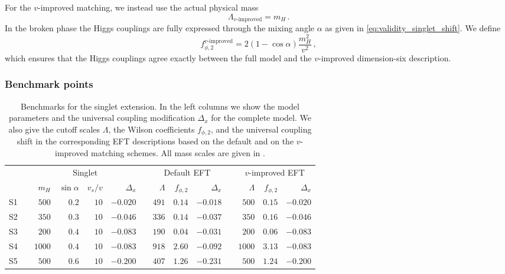 For the $v$-improved matching, we instead use the actual physical mass
%
\begin{equation}
    \Lambda_{\text{$v$-improved}} = m_H \,.
\end{equation}
%
In the broken phase the Higgs couplings are fully expressed through
the mixing angle $\alpha$ as given in
\autoref{eq:validity_singlet_shift}. We define
%
\begin{equation}
  f_{\phi,2}^{\text{$v$-improved}} = 2 ( 1 - \cos \alpha) \frac {m_H^2} {v^2} \,,
\end{equation} 
%
which ensures that the Higgs couplings agree exactly between the full
model and the $v$-improved dimension-six description.



\subsubsection{Benchmark points}

\begin{table}
  \begin{tabular}{c c rrrr c rrr c rrr}
    \toprule
    \multirow{2}{*}{} && \multicolumn{4}{c}{Singlet} &&
    \multicolumn{3}{c}{Default EFT} && \multicolumn{3}{c}{$v$-improved EFT} \\
    \cmidrule{3-6} \cmidrule{8-10} \cmidrule{12-14}
    && $m_H$ & $\sin\alpha$ & $v_s/v$ & $\Delta_x$ &&
    $\Lambda$ & ${f}_{\phi,2}$ & $\Delta_x$ &&
    $\Lambda$ & ${f}_{\phi,2}$ & $\Delta_x$ \\
    \midrule
    S1 && $500$ & $0.2$ & $10$ & $-0.020$ && $491$ & $0.14$ & $-0.018$ && $500$ & $0.15$ & $-0.020$ \\
    S2 && $350$ & $0.3$ & $10$ & $-0.046$ && $336$ & $0.14$ &  $-0.037$ && $350$ & $0.16$ & $-0.046$ \\
    S3 && $200$ & $0.4$ & $10$ & $-0.083$ && $190$ & $0.04$ & $-0.031$ && $200$ & $0.06$ & $-0.083$ \\
    S4 && $1000$ & $0.4$ & $10$ & $-0.083$ && $918$ & $2.60$ & $-0.092$ && $1000$ & $3.13$ & $-0.083$ \\
    S5 && $500$ &  $0.6$ & $10$ & $-0.200$ && $407$ &$1.26$ & $-0.231$ && $500$ &  $1.24$ & $-0.200$ \\
    \bottomrule
    \end{tabular}
    \caption[Benchmarks for the singlet extension]{Benchmarks for the
      singlet extension. In the left columns we show the model parameters
      and the universal coupling modification $\Delta_x$ for the complete
      model. We also give the cutoff scales $\Lambda$, the Wilson
      coefficients $f_{\phi,2}$, and the universal coupling shift in the corresponding
      EFT descriptions based on the default and on the $v$-improved
      matching schemes. All mass scales are given in \gev.}
  \label{tbl:validity_singlet_benchmarks}
\end{table}


